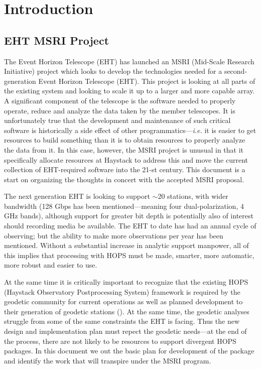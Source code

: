 %
%

\section{Introduction}
\label{sec:intro}

\subsection{EHT MSRI Project}
\label{sec:msriproj}

The Event Horizon Telescope (EHT) has launched an
MSRI (Mid-Scale Research Initiative) project which looks to develop
the technologies needed for a second-generation Event Horizon
Telescope (EHT).  This project is looking at all parts of the existing
system and looking
to scale it up to a larger and more capable array.  A significant component
of the telescope is the software needed to properly operate, reduce and
analyze the data taken by the member telescopes.  It is unfortunately true
that the development and maintenance of such critical software is historically
a side effect of other programmatics---\textit{i.e.} it is easier to get
resources to build something than it is to obtain resources to properly
analyze the data from it.  In this case, however, the MSRI project is
unusual in that it specifically allocate resources at Haystack to address
this and move the current collection
of EHT-required software into the 21-st century.  This document is a start
on organizing the thoughts in concert with the accepted MSRI proposal.

The next generation EHT is looking to support $\sim$20 stations, with
wider bandwidth (128 Gbps has been mentioned---meaning four dual-polarization,
4 GHz bands), although support for greater bit depth
is potentially also of interest should recording media be available.
The EHT to date has had an annual cycle
of observing; but the ability to make more observations per year has been
mentioned.  Without a substantial increase in analytic support manpower,
all of this implies that processing with HOPS must be made, smarter, more
automatic, more robust and easier to use.

At the same time it is critically important to recognize that the existing
HOPS (Haystack Observatory Postprocessing System)
framework is required by the geodetic community for current operations
as well as planned development to their generation of geodetic stations
(\cite{niell2018}).  At the same time, the geodetic analyses struggle
from some of the same constraints the EHT is facing.  Thus the new design and
implementation plan must repect the geodetic needs---at the end of the
process, there are not likely to be resources to support divergent HOPS
packages.  In this document we out the basic plan for development of the
package and identify the work that will transpire under the MSRI program.

